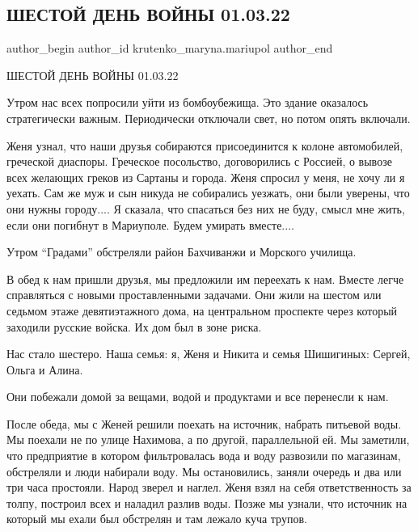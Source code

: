  
 
 
 
 

\subsection{ШЕСТОЙ ДЕНЬ ВОЙНЫ 01.03.22}
\label{sec:01_03_2023.fb.krutenko_maryna.mariupol.1.shestoi_den_voini_01}

\ifcmt
 author_begin
   author_id krutenko_maryna.mariupol
 author_end
\fi

ШЕСТОЙ ДЕНЬ ВОЙНЫ 01.03.22

Утром нас всех попросили уйти из бомбоубежища. Это здание оказалось
стратегически важным.  Периодически отключали свет, но потом опять включали. 

Женя узнал, что наши друзья собираются присоединится к колоне автомобилей,
греческой диаспоры. Греческое посольство, договорились с Россией, о вывозе всех
желающих греков из Сартаны и города. Женя спросил у меня, не хочу ли я уехать.
Сам же муж и сын никуда не собирались уезжать, они были уверены, что они нужны
городу.... Я сказала, что спасаться без них не буду, смысл мне жить, если они
погибнут в Мариуполе. Будем умирать вместе....

Утром \enquote{Градами} обстреляли район Бахчиванжи и Морского училища. 

В обед к нам пришли друзья, мы предложили им переехать к нам. Вместе легче
справляться с новыми проставленными задачами. Они жили на шестом или седьмом
этаже девятиэтажного дома, на центральном проспекте через который заходили
русские войска. Их дом был в зоне риска. 

Нас стало шестеро.  Наша семья: я, Женя и Никита и семья Шишигиных: Сергей,
Ольга и Алина. 

Они побежали домой за вещами, водой и продуктами и все перенесли к нам. 

После обеда, мы с Женей решили поехать на источник, набрать питьевой воды. Мы
поехали не по улице Нахимова, а по другой, параллельной ей. Мы заметили, что
предприятие в котором фильтровалась вода и воду развозили по магазинам,
обстреляли и люди набирали воду. Мы остановились, заняли очередь и два или три
часа простояли. Народ зверел и наглел. Женя взял на себя ответственность за
толпу, построил всех и наладил разлив воды. Позже мы узнали, что источник на
который мы ехали был обстрелян и там лежало куча трупов.

